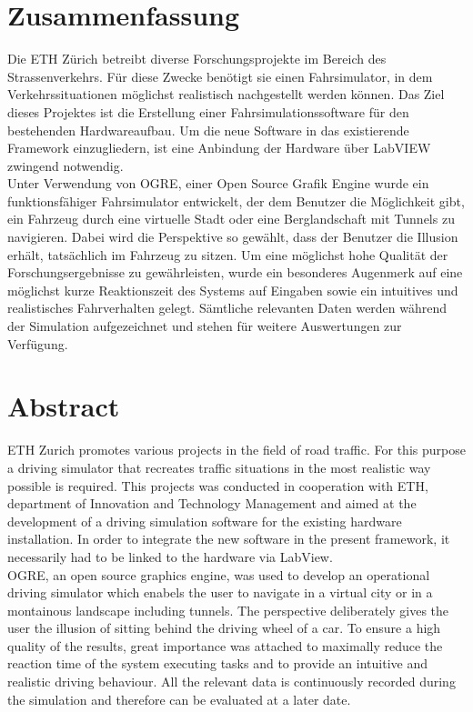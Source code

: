 \section*{Zusammenfassung}
Die ETH Zürich betreibt diverse Forschungsprojekte im Bereich des Strassenverkehrs. Für diese Zwecke benötigt sie einen Fahrsimulator, in dem Verkehrssituationen möglichst realistisch nachgestellt werden können. Das Ziel dieses Projektes ist die Erstellung einer Fahrsimulationssoftware für den bestehenden Hardwareaufbau. Um die neue Software in das existierende Framework einzugliedern, ist eine Anbindung der Hardware über LabVIEW zwingend notwendig.\\
Unter Verwendung von OGRE, einer Open Source Grafik Engine wurde ein funktionsfähiger Fahrsimulator entwickelt, der dem Benutzer die Möglichkeit gibt, ein Fahrzeug durch eine virtuelle Stadt oder eine Berglandschaft mit Tunnels zu navigieren. Dabei wird die Perspektive so gewählt, dass der Benutzer die Illusion erhält, tatsächlich im Fahrzeug zu sitzen.
Um eine möglichst hohe Qualität der Forschungsergebnisse zu gewährleisten, wurde ein besonderes Augenmerk auf eine möglichst kurze Reaktionszeit des Systems auf Eingaben sowie ein intuitives und realistisches Fahrverhalten gelegt.
Sämtliche relevanten Daten werden während der Simulation aufgezeichnet und stehen für weitere Auswertungen zur Verfügung.
\newpage
\thispagestyle{empty}
\hspace{1cm}
\newpage
\section*{Abstract}
ETH Zurich promotes various projects in the field of road traffic. For this purpose a driving simulator that recreates traffic situations in the most realistic way possible is required. This projects was conducted in cooperation with ETH, department of Innovation and Technology Management and aimed at the development of a driving simulation software for the existing hardware installation. In order to integrate the new software in the present framework, it necessarily had to be linked to the hardware via LabView. \\
OGRE, an open source graphics engine, was used to develop an operational driving simulator which enabels the user to navigate in a virtual city or in a montainous landscape including tunnels. The perspective deliberately gives the user the illusion of sitting behind the driving wheel of a car. To ensure a high quality of the results, great importance was attached to maximally reduce the reaction time of the system executing tasks and to provide an intuitive and realistic driving behaviour. All the relevant data is continuously recorded during the simulation and therefore can be evaluated at a later date.
\newpage
\thispagestyle{empty}
\hspace{1cm}
\newpage